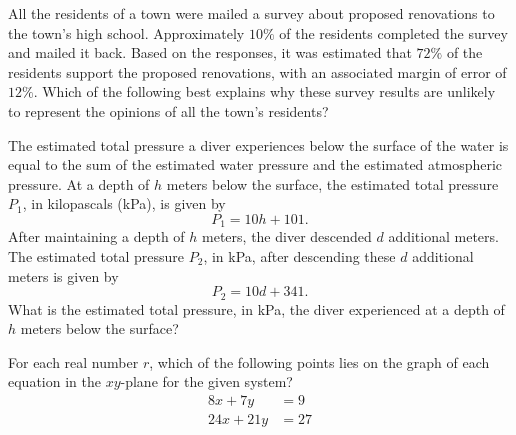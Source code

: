 \vspace{2em}

\noindent\markforreview
\vspace{1em}

All the residents of a town were mailed a survey about proposed renovations to
the town's high school. Approximately \(10\%\) of the residents completed the
survey and mailed it back. Based on the responses, it was estimated that \(72\%\)
of the residents support the proposed renovations, with an associated margin of
error of \(12\%\). Which of the following best explains why these survey results
are unlikely to represent the opinions of all the town's residents?

\newpage

\noindent\markforreview
\vspace{1em}

The estimated total pressure a diver experiences below the surface of the water
is equal to the sum of the estimated water pressure and the estimated atmospheric
pressure. At a depth of \(h\) meters below the surface, the estimated total
pressure \(P_1\), in kilopascals (kPa), is given by
\[
P_1=10h+101.
\]
After maintaining a depth of \(h\) meters, the diver descended \(d\) additional
meters. The estimated total pressure \(P_2\), in kPa, after descending these
\(d\) additional meters is given by
\[
P_2=10d+341.
\]
What is the estimated total pressure, in kPa, the diver experienced at a depth
of \(h\) meters below the surface?

\vspace{2em}

\noindent\markforreview
\vspace{1em}

For each real number \(r\), which of the following points lies on the graph of
each equation in the \(xy\)-plane for the given system?
\[
\begin{aligned}
8x+7y&=9\\
24x+21y&=27
\end{aligned}
\]

